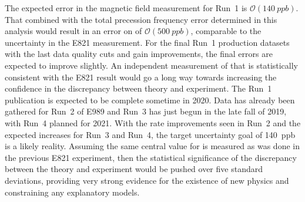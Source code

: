 The expected error in the magnetic field measurement for Run~1 is $\mathcal{O}(\SI{140}{ppb})$. That combined with the total precession frequency error determined in this analysis would result in an error on \amu of $\mathcal{O}(\SI{500}{ppb})$, comparable to the uncertainty in the E821 measurement. For the final Run~1 production datasets with the last data quality cuts and gain improvements, the final errors are expected to improve slightly. An independent measurement of \amu that is statistically consistent with the E821 result would go a long way towards increasing the confidence in the discrepancy between theory and experiment. The Run~1 publication is expected to be complete sometime in 2020. Data has already been gathered for Run~2 of E989 and Run~3 has just begun in the late fall of 2019, with Run~4 planned for 2021. With the rate improvements seen in Run~2 and the expected increases for Run~3 and Run~4, the target uncertainty goal of \SI{140}{ppb} is a likely reality. Assuming the same central value for \amu is measured as was done in the previous E821 experiment, then the statistical significance of the discrepancy between the theory and experiment would be pushed over five standard deviations, providing very strong evidence for the existence of new physics and constraining any explanatory models.







